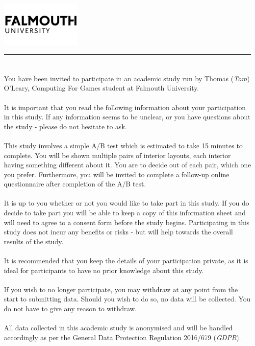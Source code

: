 \documentclass{article}
\begin{document}
\includegraphics[width=0.3\textwidth]{falmouth-university-vector-logo.png}
\vspace{-1em}

\rule{\linewidth}{1pt}
\bigskip

\section*{}
You have been invited to participate in an academic study run by Thomas (\textit{Tom}) O’Leary, Computing For Games student at Falmouth University.
\\
\\
It is important that you read the following information about your participation in this study.
If any information seems to be unclear, or you have questions about the study - please do not hesitate to ask.
\\
\\
This study involves a simple A/B test which is estimated to take 15 minutes to complete. 
You will be shown multiple pairs of interior layouts, each interior having something different 
about it. 
You are to decide out of each pair, which one you prefer. 
Furthermore, you will be invited to complete a follow-up online questionnaire after completion of the A/B test.
\\
\\
It is up to you whether or not you would like to take part in this study. 
If you do decide to take part you will be able to keep a copy of this information sheet 
and will need to agree to a consent form before the study begins.
Participating in this study does not incur any benefits or risks - but will help towards 
the overall results of the study.
\\
\\
It is recommended that you keep the details of your participation private, as it is ideal for participants to have no prior knowledge about this study.
\\
\\
If you wish to no longer participate, you may withdraw at any point from the start to submitting data.
Should you wish to do so, no data will be collected.
You do not have to give any reason to withdraw.
\\
\\
All data collected in this academic study is anonymised and will be handled accordingly as per the General Data Protection Regulation 2016/679 (\textit{GDPR}).
\bigskip
\end{document}
